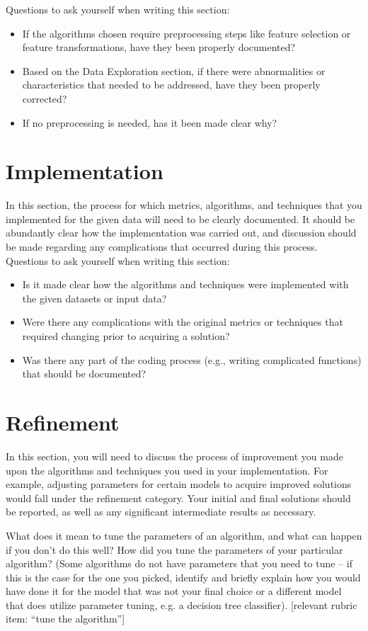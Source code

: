 \documentclass[twoside,openright,titlepage,numbers=noenddot,headinclude,%
               footinclude=true,cleardoublepage=empty,abstractoff,BCOR=5mm,%
               paper=a4,fontsize=11pt,ngerman,american]{scrreprt}
\numberwithin{theorem}{chapter}
\numberwithin{definition}{chapter}
\numberwithin{algorithm}{chapter}
\numberwithin{figure}{chapter}
\numberwithin{table}{chapter}
\numberwithin{equation}{chapter}
\begin{document}
\begin{itemize}
Questions to ask yourself when writing this section:
\begin{itemize}%
\item If the algorithms chosen require preprocessing steps like feature selection or feature transformations, have they been properly documented?
\item Based on the Data Exploration section, if there were abnormalities or characteristics that needed to be addressed, have they been properly corrected?
\item If no preprocessing is needed, has it been made clear why?
\end{itemize}


\section*{Implementation}
In this section, the process for which metrics, algorithms, and techniques that you implemented for the given data will need to be clearly documented. It should be abundantly clear how the implementation was carried out, and discussion should be made regarding any complications that occurred during this process. Questions to ask yourself when writing this section:
\begin{itemize}%
\item Is it made clear how the algorithms and techniques were implemented with the given datasets or input data?
\item Were there any complications with the original metrics or techniques that required changing prior to acquiring a solution?
\item Was there any part of the coding process (e.g., writing complicated functions) that should be documented?
\end{itemize}


\section*{Refinement}
In this section, you will need to discuss the process of improvement you made upon the algorithms and techniques you used in your implementation. For example, adjusting parameters for certain models to acquire improved solutions would fall under the refinement category. Your initial and final solutions should be reported, as well as any significant intermediate results as necessary. 

What does it mean to tune the parameters of an algorithm, and what can happen if you don't do this well?  How did you tune the parameters of your particular algorithm? (Some algorithms do not have parameters that you need to tune -- if this is the case for the one you picked, identify and briefly explain how you would have done it for the model that was not your final choice or a different model that does utilize parameter tuning, e.g. a decision tree classifier).  [relevant rubric item: ``tune the algorithm'']


\end{itemize}
\end{document}
